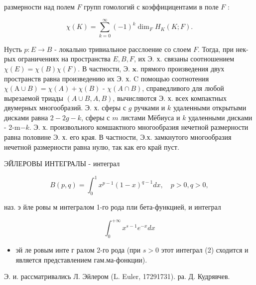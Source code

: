 \documentclass[10pt]{article}
\begin{document}
размерности над полем $F$ групп гомологий с коэффицицентами в поле $F$ :



\[

\chi(K)=\sum_{k=0}^{\infty}(-1)^{k} \operatorname{dim}_{F} H_{K}(K ; F) .

\]



Нусть $p: E \rightarrow B$ - локально тривиальное расслоение со слоем $F$. Тогда, при нек-рых ограничениях на пространства $E, B, F$, их Э. х. связаны соотношением $\chi(E)=\chi(B) \chi(F)$. В частности, Э. $\mathbf{x}$. прямого произведения двух пространств равна произведению их Э. х. $\mathrm{C}$ помощью соотнотения $\chi(\mathrm{A} \cup B)=\chi(A)+\chi(B)$ - $\chi(A \cap B)$, справедливого для любой вырезаемой триады $(A \cup B, A, B)$, вычисляются Э. х. всех компактных двумерных многообразий. Э. х. сферы с $g$ ручками и $k$ удаленными открытыми дисками равна $2-2 g-k$, сферы с $m$ листами Мёбиуса и $k$ удаленными дисками - 2-m$-k$. Э. х. произвольного комшактного многообразия нечетной размерности равна половине Э. х. его края. В частности, Э.х. замкнутого многообразия нечетной размерности равна нулю, так как его край пуст.



ЭЙЛЕРОВЫ ИНТЕГРАЛЫ - интеграл



\[

B(p, q)=\int_{0}^{1} x^{p-1}(1-x)^{q-1} d x, \quad p>0, q>0,

\]



наз. э йле ровы м интегралом 1-го рода пли бета-функцией, и интеграл



\[

\int_{0}^{+\infty} x^{s-1} e^{-x} d x

\]



\begin{itemize}

  \item эй ле ровым инте г ралом 2-го рода (при $s>0$ этот интеграл (2) сходится и является представлением гам.ма-фонкции).

\end{itemize}



Э. и. рассматривались Л. Эйлером (L. Euler, 17291731). ра. Д. Кудрявчев.
\end{document}
